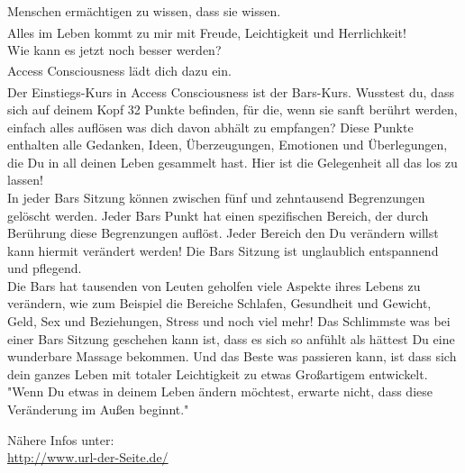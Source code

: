 \documentclass[10pt,foldmark,notumble]{leaflet}
\begin{document}
\begin{flushleft}
Menschen ermächtigen zu wissen, dass sie wissen.\\
\vspace*{4mm}
Alles im Leben kommt zu mir mit Freude, Leichtigkeit und Herrlichkeit!\textsuperscript{\textregistered}\\
\vspace*{4mm}
Wie kann es jetzt noch besser werden? \\
\vspace*{4mm}
Access Consciousness\textsuperscript{\textregistered} lädt dich dazu ein. \\
\vspace*{4mm}
Der Einstiegs-Kurs in Access Consciousness\textsuperscript{\textregistered} ist der Bars-Kurs. Wusstest du, dass sich auf deinem Kopf 32 Punkte befinden, für die, wenn sie sanft berührt werden, einfach alles auflösen was dich davon abhält zu empfangen? Diese Punkte enthalten alle Gedanken, Ideen, Überzeugungen, Emotionen und Überlegungen, die Du in all deinen Leben gesammelt hast. Hier ist die Gelegenheit all das los zu lassen!\\
\vspace*{4mm}
In jeder Bars Sitzung können zwischen fünf und zehntausend Begrenzungen gelöscht werden. Jeder Bars Punkt hat einen spezifischen Bereich, der durch Berührung diese Begrenzungen auflöst. Jeder Bereich den Du verändern willst kann hiermit verändert werden! Die Bars Sitzung ist unglaublich entspannend und pflegend.\\
\vspace*{4mm}
Die Bars hat tausenden von Leuten geholfen viele Aspekte ihres Lebens zu verändern, wie zum Beispiel die Bereiche Schlafen, Gesundheit und Gewicht, Geld, Sex und Beziehungen, Stress und noch viel mehr! Das Schlimmste was bei einer Bars Sitzung geschehen kann ist, dass es sich so anfühlt als hättest Du eine wunderbare Massage bekommen. Und das Beste was passieren kann, ist dass sich dein ganzes Leben mit totaler Leichtigkeit zu etwas Großartigem entwickelt.\\
\vspace*{4mm}
"Wenn Du etwas in deinem Leben ändern möchtest, erwarte nicht, dass diese Veränderung im Außen beginnt."\\
\end{flushleft}

\begin{center}
Nähere Infos unter:\\
{\url{http://www.url-der-Seite.de/}} \\
\end{center}
\end{document}
